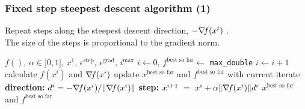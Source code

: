 \documentclass[12pt]{beamer}
\begin{document}
\begin{frame}
\frametitle{Fixed step steepest descent algorithm (1)} 
Repeat steps along the steepest descent direction, $-\nabla\!{f}(x^t)$ \cite{cauchy1847methode}. \\
The size of the steps is proportional to the gradient norm.
\begin{block}{}
\begin{algorithmic}
\REQUIRE $f()$, $\alpha \in ]0,1]$, $x^1$, $\epsilon^{\text{step}}$, $\epsilon^{\text{grad}}$, $i^{\text{max}}$
\STATE $i\leftarrow 0$, $f^{\text{best so far}} \leftarrow $ \texttt{max\_double}
\REPEAT 
\STATE $i \leftarrow i+1$
\STATE calculate $f(x^i)$ and $\nabla\!{f}(x^i)$
\STATE update $x^{\text{best so far}}$ and $f^{\text{best so far}}$ with current iterate
\ENDIF
\STATE \textbf{direction: } $d^i = - \nabla\!{f}(x^i) / \lVert \nabla\!{f}(x^i) \rVert$
\STATE \textbf{step: } $x^{i+1} ~=~ x^i + \alpha \lVert \nabla\!{f}(x^i) \rVert d^i$
\RETURN $x^{\text{best so far}}$ and $f^{\text{best so far}}$
\end{algorithmic}
\end{block}
\end{frame}
\end{document}
